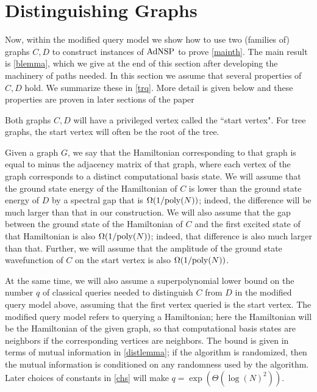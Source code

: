 \documentclass[letterpaper,onecolumn]{quantumarticle}
\newcommand{\poly}{{\rm poly}}
\newcommand{\Ocl}{{\rm AdNSP}}
\begin{document}
\section{Distinguishing Graphs}
\label{distg}
Now, within the modified query model we show how to use two (families of) graphs $C,D$ to construct instances of $\Ocl$ to prove  \cref{mainth}.  The main result is \cref{blemma}, which we give at the end of this section after developing the machinery of paths needed.
In this section we assume that several properties of $C,D$ hold.  We summarize these in \cref{trq}.  More detail is given below and these properties are proven in later sections of the paper

Both graphs $C,D$ will have a privileged vertex called the ``start vertex".  For tree graphs, the start vertex will often be the root of the tree.  

Given a graph $G$, we say that the Hamiltonian corresponding to that graph is equal to minus the adjacency matrix of that graph, where each vertex of the graph corresponds to a distinct computational basis state.
We will assume that the ground state energy of the Hamiltonian of $C$ is lower than the ground state energy of $D$ by a spectral gap that is $\Omega(1/\poly(N))$; indeed, the difference will be much larger than that in our construction.
We will also assume that the gap between the ground state of the Hamiltonian of $C$ and the first excited state of that Hamiltonian is also $\Omega(1/\poly(N))$; indeed, that difference is also much larger than that.
Further, we will assume that the amplitude of the ground state wavefunction of $C$ on the start vertex is also $\Omega(1/\poly(N))$.


At the same time, we will also assume a superpolynomial lower bound on the number $q$ of classical queries needed to distinguish $C$ from $D$ in the modified query model above, assuming that the first vertex queried is the start vertex.
The modified query model refers to querying a Hamiltonian; here the Hamiltonian will be the Hamiltonian of the given graph, so that computational basis states are neighbors if the corresponding vertices are neighbors.
The bound is given in terms of mutual information in \cref{distlemma}; if the algorithm is randomized, then the mutual information is conditioned on any randomness used by the algorithm.
Later choices of constants in \cref{chs} will make $q=\exp(\Theta(\log(N)^2))$.
\end{document}
